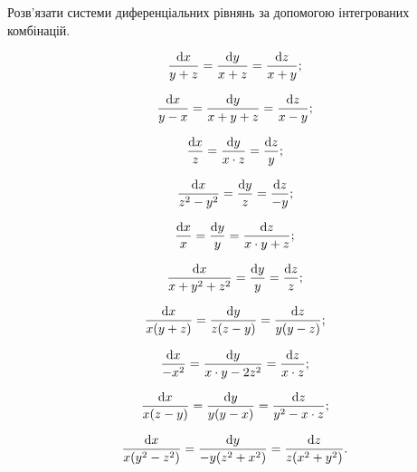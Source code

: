 Розв’язати системи диференціальних рівнянь за допомогою інтегрованих комбінацій.

\begin{multicols}{2}
\begin{problem}
	\[ \frac{\mathop{}\!\mathrm{d} x}{y + z} = \frac{\mathop{}\!\mathrm{d} y}{x + z} = \frac{\mathop{}\!\mathrm{d} z}{x + y}; \]
\end{problem}
\begin{problem}
	\[ \frac{\mathop{}\!\mathrm{d} x}{y - x} = \frac{\mathop{}\!\mathrm{d} y}{x + y + z} = \frac{\mathop{}\!\mathrm{d} z}{x - y}; \]
\end{problem}
\begin{problem}
	\[ \frac{\mathop{}\!\mathrm{d} x}{z} = \frac{\mathop{}\!\mathrm{d} y}{x \cdot z} = \frac{\mathop{}\!\mathrm{d} z}{y}; \]
\end{problem}
\begin{problem}
	\[ \frac{\mathop{}\!\mathrm{d} x}{z^2 - y^2} = \frac{\mathop{}\!\mathrm{d} y}{z} = \frac{\mathop{}\!\mathrm{d} z}{- y}; \]
\end{problem}
\begin{problem}
	\[ \frac{\mathop{}\!\mathrm{d} x}{x} = \frac{\mathop{}\!\mathrm{d} y}{y} = \frac{\mathop{}\!\mathrm{d} z}{x \cdot y + z}; \]
\end{problem}
\begin{problem}
	\[ \frac{\mathop{}\!\mathrm{d} x}{x + y^2 + z^2} = \frac{\mathop{}\!\mathrm{d} y}{y} = \frac{\mathop{}\!\mathrm{d} z}{z}; \]
\end{problem}
\begin{problem}
	\[ \frac{\mathop{}\!\mathrm{d} x}{x (y + z)} = \frac{\mathop{}\!\mathrm{d} y}{z (z - y)} = \frac{\mathop{}\!\mathrm{d} z}{y  (y - z)}; \]
\end{problem}
\begin{problem}
	\[ \frac{\mathop{}\!\mathrm{d} x}{-x^2} = \frac{\mathop{}\!\mathrm{d} y}{x \cdot y - 2 z^2} = \frac{\mathop{}\!\mathrm{d} z}{x \cdot z}; \]
\end{problem}
\begin{problem}
	\[ \frac{\mathop{}\!\mathrm{d} x}{x (z - y)} = \frac{\mathop{}\!\mathrm{d} y}{y (y - x)} = \frac{\mathop{}\!\mathrm{d} z}{y^2 - x \cdot z}; \]
\end{problem}
\begin{problem}
	\[ \frac{\mathop{}\!\mathrm{d} x}{x (y^2 - z^2)} = \frac{\mathop{}\!\mathrm{d} y}{- y (z^2 + x^2)} = \frac{\mathop{}\!\mathrm{d} z}{z (x^2 + y^2)}. \]
\end{problem}
\end{multicols}
